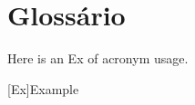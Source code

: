 \documentclass{article}
\begin{document}
\section{Glossário}

Here is an \ac{Ex} of acronym usage.

\begin{acronym} \itemsep=-8pt
  [Ex]{Example}
\end{acronym}

\printbibliography





\end{document}
